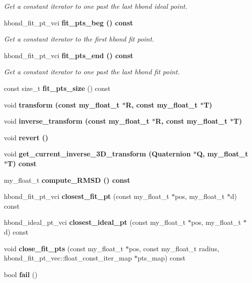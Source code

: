 \begin{CompactItemize}
\begin{CompactList}\small\item\em Get a constant iterator to one past the last hbond ideal point. \item\end{CompactList}\item 
hbond\_\-fit\_\-pt\_\-vci \bf{fit\_\-pts\_\-beg} () const \label{classASCbase_1_1HbondPoints_9bdd5a0296d972353e432b010b7964dd}

\begin{CompactList}\small\item\em Get a constant iterator to the first hbond fit point. \item\end{CompactList}\item 
hbond\_\-fit\_\-pt\_\-vci \bf{fit\_\-pts\_\-end} () const \label{classASCbase_1_1HbondPoints_2b5bf1df8a99b0f1b933526cca817e86}

\begin{CompactList}\small\item\em Get a constant iterator to one past the last hbond fit point. \item\end{CompactList}\item 
const size\_\-t \textbf{fit\_\-pts\_\-size} () const \label{classASCbase_1_1HbondPoints_0d26e83f90943a2e13158647cd11d0c7}

\item 
void \bf{transform} (const my\_\-float\_\-t $\ast$R, const my\_\-float\_\-t $\ast$T)
\item 
void \bf{inverse\_\-transform} (const my\_\-float\_\-t $\ast$R, const my\_\-float\_\-t $\ast$T)
\item 
void \bf{revert} ()
\item 
void \bf{get\_\-current\_\-inverse\_\-3D\_\-transform} (Quaternion $\ast$Q, my\_\-float\_\-t $\ast$T) const 
\item 
my\_\-float\_\-t \bf{compute\_\-RMSD} () const 
\item 
hbond\_\-fit\_\-pt\_\-vci \textbf{closest\_\-fit\_\-pt} (const my\_\-float\_\-t $\ast$pos, my\_\-float\_\-t $\ast$d) const \label{classASCbase_1_1HbondPoints_6ed493e533d9b4d58040452835edc0bf}

\item 
hbond\_\-ideal\_\-pt\_\-vci \textbf{closest\_\-ideal\_\-pt} (const my\_\-float\_\-t $\ast$pos, my\_\-float\_\-t $\ast$d) const \label{classASCbase_1_1HbondPoints_bb868c3415537bf4201293ed155f8de6}

\item 
void \textbf{close\_\-fit\_\-pts} (const my\_\-float\_\-t $\ast$pos, const my\_\-float\_\-t radius, hbond\_\-fit\_\-pt\_\-vec::float\_\-const\_\-iter\_\-map $\ast$pts\_\-map) const \label{classASCbase_1_1HbondPoints_199ab61731d64ddbc1f1693dc27b5b58}

\item 
bool \textbf{fail} ()\label{classASCbase_1_1HbondPoints_693b4ff8920d1fb4245f10bcc2210c36}

\end{CompactItemize}
